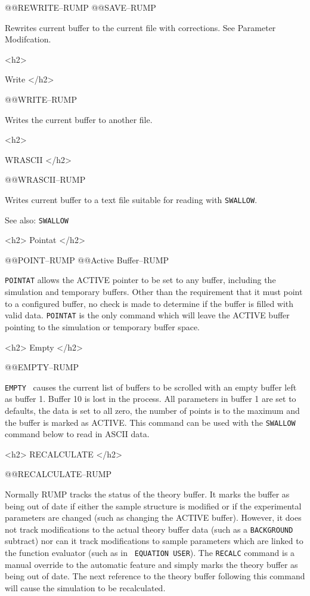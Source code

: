 {{@@{REWRITE--RUMP} @@{SAVE--RUMP}

Rewrites current buffer to the current file with corrections.
See Parameter Modifcation.

<h2> {Write </h2>


@@{WRITE--RUMP}

Writes the current buffer to another file.

<h2> {WRASCII </h2>


@@{WRASCII--RUMP}

Writes current buffer to a text file suitable for reading with {\tt SWALLOW}.

See also: {\tt SWALLOW}

<h2> Pointat </h2>


@@{POINT--RUMP} @@{Active Buffer--RUMP}

{\tt POINTAT} allows the ACTIVE pointer to be set to any buffer, including the
simulation and temporary buffers.  Other than the requirement that it must
point to a configured buffer, no check is made to determine if the buffer is
filled with valid data.  {\tt POINTAT} is the only command which will leave
the ACTIVE buffer pointing to the simulation or temporary buffer space.

<h2> Empty </h2>


@@{EMPTY--RUMP}

{\tt EMPTY } causes the current list of buffers to be scrolled with an empty
buffer left as buffer 1.  Buffer 10 is lost in the process.  All parameters in
buffer 1 are set to defaults, the data is set to all zero, the number of
points is to the maximum and the buffer is marked as ACTIVE.  This command
can be used with the {\tt SWALLOW} command below to read in ASCII data.

<h2> RECALCULATE </h2>


@@{RECALCULATE--RUMP}

Normally RUMP tracks the status of the theory buffer.  It marks the buffer
as being out of date if either the sample structure is modified or if the
experimental parameters are changed (such as changing the ACTIVE buffer).
However, it does not track modifications to the actual theory buffer data
(such as a {\tt BACKGROUND} subtract) nor can it track modifications to sample
parameters which are linked to the function evaluator (such as in {\tt
EQUATION USER}).  The {\tt RECALC} command is a manual override to the
automatic feature and simply marks the theory buffer as being out of date.
The next reference to the theory buffer following this command will cause the
simulation to be recalculated.


}}}}
